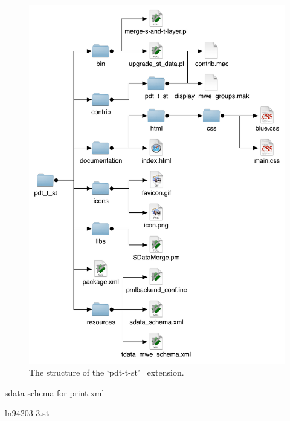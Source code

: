 \begin{figure}[htbp]
   \centering
   \includegraphics[width=\textwidth]{images/extension-structure} 
   \caption{The structure of the `pdt-t-st' \tred\ extension.}
   \label{fig:tred-ext}
\end{figure}

 {sdata-schema-for-print.xml} 

 {ln94203-3.st} 